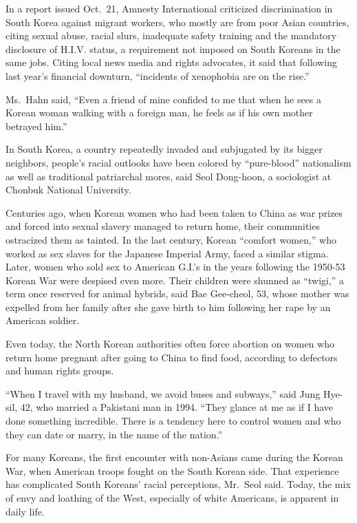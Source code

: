 ﻿\documentclass[12pt]{article}
\begin{document}
In a report issued Oct.~21, Amnesty International criticized discrimination in South Korea against
migrant workers, who mostly are from poor Asian countries, citing sexual abuse, racial slurs,
inadequate safety training and the mandatory disclosure of H.I.V. status, a requirement not imposed
on South Koreans in the same jobs. Citing local news media and rights advocates, it said that
following last year's financial downturn, ``incidents of xenophobia are on the rise.''

Ms.~Hahn said, ``Even a friend of mine confided to me that when he sees a Korean woman walking with
a foreign man, he feels as if his own mother betrayed him.''

In South Korea, a country repeatedly invaded and subjugated by its bigger neighbors, people's racial
outlooks have been colored by ``pure-blood'' nationalism as well as traditional patriarchal mores,
said Seol Dong-hoon, a sociologist at Chonbuk National University.

Centuries ago, when Korean women who had been taken to China as war prizes and forced into sexual
slavery managed to return home, their communities ostracized them as tainted. In the last century,
Korean ``comfort women,'' who worked as sex slaves for the Japanese Imperial Army, faced a similar
stigma. Later, women who sold sex to American G.I.'s in the years following the 1950-53 Korean War
were despised even more. Their children were shunned as ``twigi,'' a term once reserved for animal
hybrids, said Bae Gee-cheol, 53, whose mother was expelled from her family after she gave birth to
him following her rape by an American soldier.

Even today, the North Korean authorities often force abortion on women who return home pregnant
after going to China to find food, according to defectors and human rights groups.

``When I travel with my husband, we avoid buses and subways,'' said Jung Hye-sil, 42, who married a
Pakistani man in 1994. ``They glance at me as if I have done something incredible. There is a
tendency here to control women and who they can date or marry, in the name of the nation.''

For many Koreans, the first encounter with non-Asians came during the Korean War, when American
troops fought on the South Korean side. That experience has complicated South Koreans' racial
perceptions, Mr.~Seol said. Today, the mix of envy and loathing of the West, especially of white
Americans, is apparent in daily life.
\end{document}
